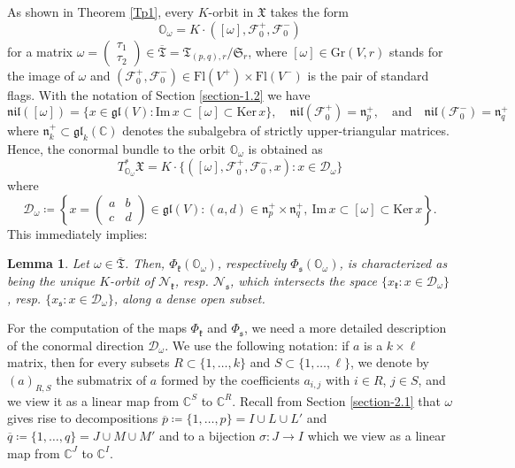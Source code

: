 \documentclass[11pt]{article}
\newtheorem{lemma}[theo]{Lemma}
\theoremstyle{definition}
\numberwithin{equation}{section}
\newcommand{\fk}{\mathfrak{k}}
\newcommand{\fs}{\mathfrak{s}}
\newcommand{\fn}{\mathfrak{n}}
\newcommand{\gl}{\mathfrak{gl}}
\newcommand{\nil}{\mathfrak{nil}}
\newcommand{\subm}[2]{(#1)_{#2}}
\newcommand{\flag}{\mathcal{F}}
\newcommand{\Xorbit}{\mathbb{O}}
\newcommand{\nilpotentsof}[1]{\mathcal{N}_{#1}}
\newcommand{\condir}{\mathcal{D}}
\newcommand{\intp}{\overline{p}}
\newcommand{\intq}{\overline{q}}
\newcommand{\permutationsof}[1]{\mathfrak{S}_{#1}}
\newcommand{\ppermutationsof}{\mathfrak{T}}
\newcommand{\parameters}{\overline{\ppermutationsof}}
\newcommand{\Xfv}{\mathfrak{X}}
\newcommand{\Grass}{\mathrm{Gr}}
\newcommand{\Flags}{\mathrm{Fl}}
\newcommand{\mC}{\mathbb{C}}
\begin{document}
As shown in Theorem \ref{Tp1}, every $K$-orbit in $\Xfv$ takes the form
\[
\Xorbit_\omega=K\cdot([\omega],\flag_0^+,\flag_0^-)
\]
for a matrix $\omega=\begin{pmatrix} \tau_1\\ \tau_2 \end{pmatrix}\in \parameters=\ppermutationsof_{(p,q),r}/\permutationsof{r}$,
where $[\omega]\in\Grass(V,r)$ stands for the image of $\omega$ and $(\flag_0^+,\flag_0^-)\in\Flags(V^+)\times \Flags(V^-)$ is the pair of standard flags.
With the notation of Section \ref{section-1.2} we have
\[\nil([\omega])=\{x\in\gl(V):\mathrm{Im}\,x\subset[\omega]\subset\mathrm{Ker}\,x\},\quad \nil(\flag_0^+)=\fn_p^+,\quad \mbox{and}\quad \nil(\flag_0^-)=\fn_q^+\]
where $\fn_k^+\subset\gl_k(\mC)$ denotes the subalgebra of strictly upper-triangular matrices.
Hence, the conormal bundle to the orbit $\Xorbit_\omega$ is obtained as
\[T^*_{\Xorbit_\omega}\Xfv=K\cdot\{([\omega],\flag_0^+,\flag_0^-,x):x\in\condir_\omega\}\]
where
\begin{equation}
\label{Domega}
\condir_\omega\coloneqq \left\{x=\begin{pmatrix} a & b\\ c & d\end{pmatrix}\in\gl(V):(a,d)\in\fn_p^+\times\fn_q^+,\ \mathrm{Im}\,x\subset[\omega]\subset\mathrm{Ker}\,x\right\}.
\end{equation}
This immediately implies:

\begin{lemma}
\label{L4.1}
Let $\omega\in\parameters$.
Then, $\Phi_\fk(\Xorbit_\omega)$, respectively $\Phi_\fs(\Xorbit_\omega)$,
is characterized as being the unique $K$-orbit of $\nilpotentsof{\fk}$, resp. $\nilpotentsof{\fs}$, which intersects the space $\{x_\fk:x\in\condir_\omega\}$, resp. $\{x_\fs:x\in\condir_\omega\}$, along a dense open subset.
\end{lemma}

For the computation of the maps $\Phi_\fk$ and $\Phi_\fs$, we need a more detailed description of the conormal direction $\condir_\omega$.
We use the following notation: if $a$ is a $k\times \ell$ matrix, then for every subsets $R\subset\{1,\ldots,k\}$ and $S\subset\{1,\ldots,\ell\}$, we denote by $\subm{a}{R,S}$ the submatrix of $a$ formed by the coefficients $a_{i,j}$ with $i\in R$, $j\in S$, and we view it as a linear map from $\mC^S$ to $\mC^R$. Recall from Section \ref{section-2.1}
that $\omega$ gives rise to decompositions $\intp\coloneqq \{1,\ldots,p\}=I\cup L\cup L'$ and $\intq\coloneqq \{1,\ldots,q\}=J\cup M\cup M'$ and to a bijection $\sigma:J\to I$ which we view as a linear map from $\mC^J$ to $\mC^I$.
\end{document}
